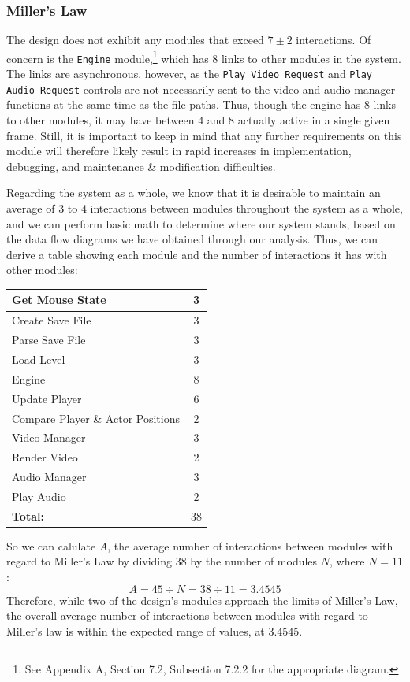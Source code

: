 \documentclass{article}
\begin{document}
		\subsubsection{Miller's Law}
			The design does not exhibit any modules that exceed $7\pm2$ interactions. Of concern is the \texttt{Engine} module,\footnote{See Appendix A, Section 7.2, Subsection 7.2.2 for the appropriate diagram.} which has 8 links to other modules in the system. The links are asynchronous, however, as the \texttt{Play Video Request} and \texttt{Play Audio Request} controls are not necessarily sent to the video and audio manager functions at the same time as the file paths. Thus, though the engine has 8 links to other modules, it may have between 4 and 8 actually active in a single given frame. Still, it is important to keep in mind that any further requirements on this module will therefore likely result in rapid increases in implementation, debugging, and maintenance \& modification difficulties. 
			
			Regarding the system as a whole, we know that it is desirable to maintain an average of 3 to 4 interactions between modules throughout the system as a whole, and we can perform basic math to determine where our system stands, based on the data flow diagrams we have obtained through our analysis. Thus, we can derive a table showing each module and the number of interactions it has with other modules:
			\begin{center}
				\begin{tabular}{| l || c |}
					\hline
					Get Mouse State 					& 3 \\ \hline
					Create Save File					& 3 \\ \hline
					Parse Save File 					& 3 \\ \hline
					Load Level							& 3 \\ \hline
					Engine								& 8 \\ \hline
					Update Player						& 6 \\ \hline
					Compare Player \& Actor Positions	& 2 \\ \hline
					Video Manager						& 3 \\ \hline
					Render Video						& 2 \\ \hline
					Audio Manager						& 3 \\ \hline
					Play Audio							& 2 \\ \hline
					\textbf{Total:}						& 38 \\
					\hline
				\end{tabular}
			\end{center}
			So we can calulate $A$, the average number of interactions between modules with regard to Miller's Law by dividing 38 by the number of modules $N$, where $N = 11$: 
			$$A = 45 \div N = 38 \div 11 = 3.4545$$
			Therefore, while two of the design's modules approach the limits of Miller's Law, the overall average number of interactions between modules with regard to Miller's law is within the expected range of values, at $3.4545$. 
\end{document}
